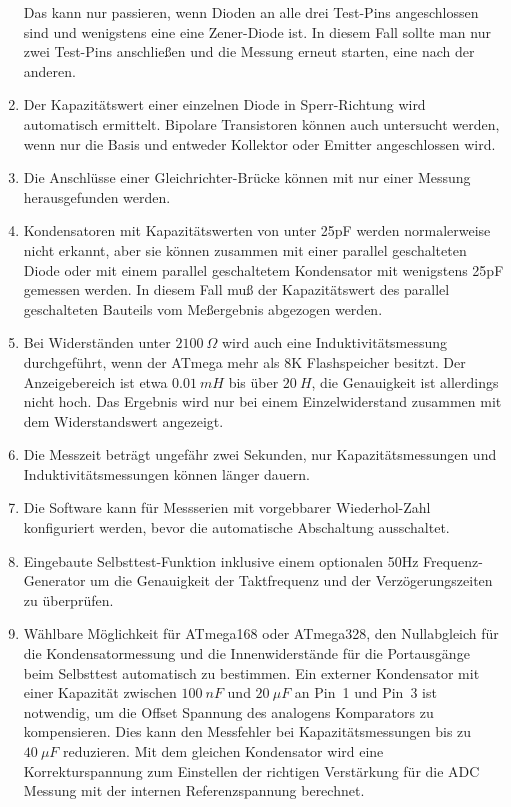 \begin{enumerate}
Das kann nur passieren, wenn Dioden an alle drei Test-Pins angeschlossen sind und wenigstens eine eine Zener-Diode ist.
In diesem Fall sollte man nur zwei Test-Pins anschließen und die Messung erneut starten, eine nach der anderen.
\item Der Kapazitätswert einer einzelnen Diode in Sperr-Richtung wird automatisch ermittelt.
Bipolare Transistoren können auch untersucht werden, wenn nur die Basis und entweder Kollektor oder Emitter angeschlossen wird.
\item Die Anschlüsse einer Gleichrichter-Brücke können mit nur einer Messung herausgefunden werden.
\item Kondensatoren mit Kapazitätswerten von unter 25pF werden normalerweise nicht erkannt, 
aber sie können zusammen mit einer parallel geschalteten Diode oder mit einem parallel geschaltetem Kondensator mit
wenigstens 25pF gemessen werden.
In diesem Fall muß der Kapazitätswert des parallel geschalteten Bauteils vom Meßergebnis abgezogen werden.
\item Bei Widerständen unter \(2100~\Omega\) wird auch eine Induktivitätsmessung durchgeführt, wenn der
ATmega mehr als 8K Flashspeicher besitzt.
Der Anzeigebereich ist etwa \(0.01~mH\) bis über \(20~H\), die Genauigkeit ist allerdings nicht hoch.
Das Ergebnis wird nur bei einem Einzelwiderstand zusammen mit dem Widerstandswert angezeigt.
\item Die Messzeit beträgt ungefähr zwei Sekunden, nur Kapazitätsmessungen und Induktivitätsmessungen können länger dauern.
\item Die Software kann für Messserien mit vorgebbarer Wiederhol-Zahl konfiguriert werden, bevor die automatische Abschaltung ausschaltet.
\item Eingebaute Selbsttest-Funktion inklusive einem optionalen 50Hz Frequenz-Generator um die Genauigkeit der Taktfrequenz
und der Verzögerungszeiten zu überprüfen.
\item Wählbare Möglichkeit für ATmega168 oder ATmega328, den Nullabgleich für die Kondensatormessung und die Innenwiderstände für die
Portausgänge beim Selbsttest automatisch zu bestimmen.
Ein externer Kondensator mit einer Kapazität zwischen \(100~nF\) und \(20~\mu F\) an Pin~1 und Pin~3 ist notwendig, 
um die Offset Spannung des analogens Komparators zu kompensieren.
Dies kann den Messfehler bei Kapazitätsmessungen bis zu \(40~\mu F\) reduzieren.
Mit dem gleichen Kondensator wird eine Korrekturspannung zum Einstellen der richtigen Verstärkung für
die ADC Messung mit der internen Referenzspannung berechnet.
\end{enumerate}

